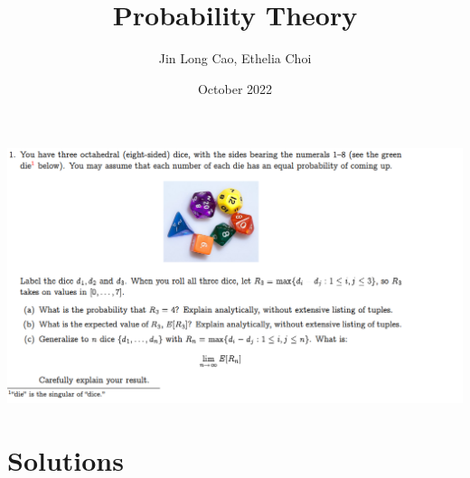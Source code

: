 \documentclass{article}
\title{Probability Theory}
\author{Jin Long Cao, Ethelia Choi}
\date{October 2022}
\begin{document}
\maketitle
\includegraphics[width=\textwidth]{Probability Theory}

\newpage
\section*{Solutions}
\end{document}
